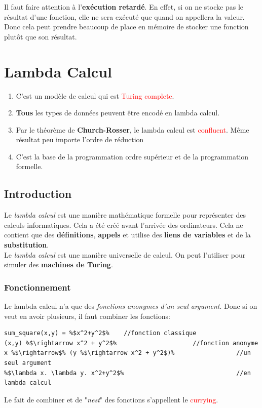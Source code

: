 \documentclass{report}
\begin{document}
Il faut faire attention à l'\textbf{exécution retardé}. En effet, si on ne stocke pas le résultat d'une fonction, elle ne sera exécuté que quand on appellera la valeur. Donc cela peut prendre beaucoup de place en mémoire de stocker une fonction plutôt que son résultat.


\chapter{Lambda Calcul}
\begin{enumerate}
\item C'est un modèle de calcul qui est \textcolor{red}{Turing complete}. 
\item \textbf{Tous} les types de données peuvent être encodé en lambda calcul.
\item Par le théorème de \textbf{Church-Rosser}, le lambda calcul est \textcolor{red}{confluent}. Même résultat peu importe l'ordre de réduction
\item C'est la base de la programmation ordre supérieur et de la programmation formelle.
\end{enumerate}
\section{Introduction}
Le \textit{lambda calcul} est une manière mathématique formelle pour représenter des calculs informatiques. Cela a été créé avant l'arrivée des ordinateurs. Cela ne contient que des \textbf{définitions}, \textbf{appels} et utilise des \textbf{liens de variables} et de la \textbf{substitution}.\\

Le \textit{lambda calcul} est une manière universelle de calcul. On peut l'utiliser pour simuler des \textbf{machines de Turing}.

\subsection{Fonctionnement}
Le lambda calcul n'a que des \textit{fonctions anonymes d'un seul argument}. Donc si on veut en avoir plusieurs, il faut combiner les fonctions:
\begin{lstlisting}[escapechar=\%]
sum_square(x,y) = %$x^2+y^2$%	 //fonction classique
(x,y) %$\rightarrow x^2 + y^2$%						//fonction anonyme
x %$\rightarrow$% (y %$\rightarrow x^2 + y^2$)%					//un seul argument
%$\lambda x. \lambda y. x^2+y^2$%								//en lambda calcul    
\end{lstlisting}
Le fait de combiner et de "\textit{nest}" des fonctions s'appellent le \textcolor{red}{currying}.
\end{document}
